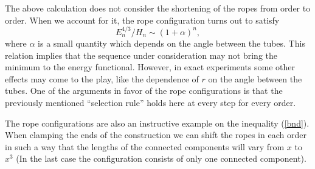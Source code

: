 \documentclass[a4paper,12pt]{article}
\begin{document}
	The above calculation does not consider the shortening
	of the ropes from order to order. When we account for it,
	the rope configuration turns out to satisfy
\begin{equation}
    E^{4/3}_{n} / H_{n} \sim (1 + \alpha)^{n} ,
\end{equation}
	where 
    $ \alpha $
	is a small quantity which depends on the angle between the tubes.
	This relation implies that the sequence under consideration 
	may not bring the minimum to the energy functional.
	However, in exact experiments some other effects may come
	to the play, like the dependence of
    $ r $
	on the angle between the tubes.
	One of the arguments in favor of the rope configurations
	is that the previously mentioned ``selection rule'' holds here at every
	step for every order.

	The rope configurations are also an instructive example on the
	inequality 
(\ref{bnd}).
	When clamping the ends of the construction we can shift
	the ropes in each order in such a way that the lengths
	of the connected components will vary from
    $ x $
	to 
    $ x^{3} $ 
	(In the last case the configuration consists of only
	one connected component).
\end{document}
